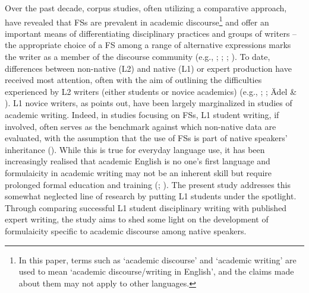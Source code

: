 Over the past decade, corpus studies, often utilizing a comparative approach, have revealed that FSs are prevalent in academic discourse\footnote{In this paper, terms such as ‘academic discourse’ and ‘academic writing’ are used to mean ‘academic discourse/writing in English’, and the claims made about them may not apply to other languages.} and offer an important means of differentiating disciplinary practices and groups of writers – the appropriate choice of a FS among a range of alternative expressions marks the writer as a member of the discourse community (e.g., \citealt{BiberEtAl2004}; \citealt{Cortes2004}; \citealt{Hyland2008a,20122008a}; \citealt{Durrant2017}). To date, differences between non-native (L2) and native (L1) or expert production have received most attention, often with the aim of outlining the difficulties experienced by L2 writers (either students or novice academics) (e.g., \citealt{Hyland2008b}; \citealt{ChenBaker2010}; Ädel \& \citealt{Erman2012}). L1 novice writers, as \citet{Hyland2016} points out, have been largely marginalized in studies of academic writing. Indeed, in studies focusing on FSs, L1 student writing, if involved, often serves as the benchmark against which non-native data are evaluated, with the assumption that the use of FSs is part of native speakers’ inheritance (\citealt{WrayPerkins2000}). While this is true for everyday language use, it has been increasingly realised that academic English is no one’s first language and formulaicity in academic writing may not be an inherent skill but require prolonged formal education and training (\citealt{FergusonEtAl2011}; \citealt{Pérez-Llantada2014}). The present study addresses this somewhat neglected line of research by putting L1 students under the spotlight. Through comparing successful L1 student disciplinary writing with published expert writing, the study aims to shed some light on the development of formulaicity specific to academic discourse among native speakers. 

